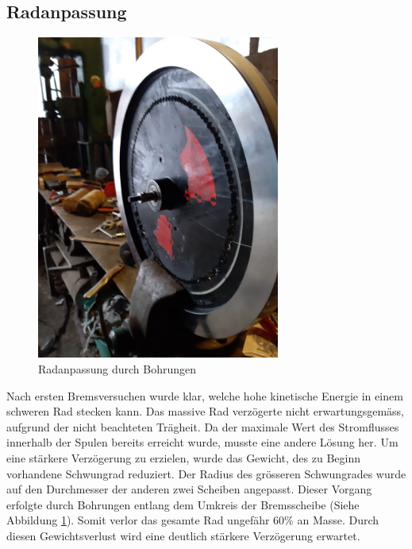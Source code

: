 \subsection{Radanpassung}\label{cap:methoden_radanpassung}
\begin{figure}[ht]
  \begin{center}
    \includegraphics[width=8cm]{assets/images/rad}
  \end{center}
  \vspace{-3ex}
  \caption{Radanpassung durch Bohrungen}
  \label{fig:radanpassung_bild}
\end{figure}
Nach ersten Bremsversuchen wurde klar, welche hohe kinetische Energie in einem schweren Rad stecken kann. Das massive Rad verzögerte nicht erwartungsgemäss, aufgrund der nicht beachteten Trägheit.
\newpara
Da der maximale Wert des Stromflusses innerhalb der Spulen bereits erreicht wurde, musste eine andere Lösung her. Um eine stärkere Verzögerung zu erzielen, wurde das Gewicht, des zu Beginn vorhandene Schwungrad reduziert. 
\newpara
Der Radius des grösseren Schwungrades wurde auf den Durchmesser der anderen zwei Scheiben angepasst. Dieser Vorgang erfolgte durch Bohrungen entlang dem Umkreis der Bremsscheibe (Siehe Abbildung \ref{fig:radanpassung_bild}). Somit verlor das gesamte Rad ungefähr 60\% an Masse.
\newpara
Durch diesen Gewichtsverlust wird eine deutlich stärkere Verzögerung erwartet.
